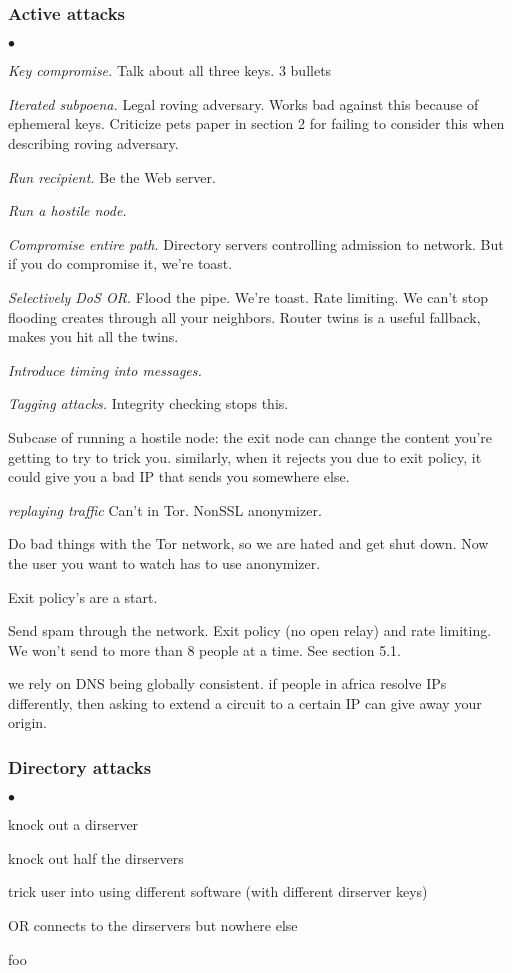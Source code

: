 \documentclass[times,10pt,twocolumn]{article}
\newenvironment{tightlist}{\begin{list}{$\bullet$}{
  \setlength{\itemsep}{0mm}
    \setlength{\parsep}{0mm}
    }}{\end{list}}
\begin{document}
\subsubsection*{Active attacks}
\begin{tightlist}
\item \emph{Key compromise.} Talk about all three keys. 3 bullets
\item \emph{Iterated subpoena.} Legal roving adversary. Works bad against
this because of ephemeral keys. Criticize pets paper in section 2 for
failing to consider this when describing roving adversary.
\item \emph{Run recipient.} Be the Web server.
\item \emph{Run a hostile node.} 
\item \emph{Compromise entire path.} Directory servers controlling admission
to network. But if you do compromise it, we're toast.
\item \emph{Selectively DoS OR.} Flood the pipe. We're toast. Rate limiting.
We can't stop flooding creates through all your neighbors. Router twins
is a useful fallback, makes you hit all the twins.
\item \emph{Introduce timing into messages.}
\item \emph{Tagging attacks.}
Integrity checking stops this.

Subcase of running a hostile node: 
the exit node can change the content you're getting to try to
trick you. similarly, when it rejects you due to exit policy,
it could give you a bad IP that sends you somewhere else.
\item \emph{replaying traffic} Can't in Tor. NonSSL anonymizer.

\item Do bad things with the Tor network, so we are hated and
get shut down. Now the user you want to watch has to use anonymizer.

Exit policy's are a start.

\item Send spam through the network. Exit policy (no open relay) and
  rate limiting. We won't send to more than 8 people at a time.  See
  section 5.1.

we rely on DNS being globally consistent. if people in africa resolve
IPs differently, then asking to extend a circuit to a certain IP can
give away your origin.
\end{tightlist}

\subsubsection*{Directory attacks}
\begin{tightlist}
\item knock out a dirserver
\item knock out half the dirservers
\item trick user into using different software (with different dirserver
keys)
\item OR connects to the dirservers but nowhere else
\item foo
\end{tightlist}
\end{document}
